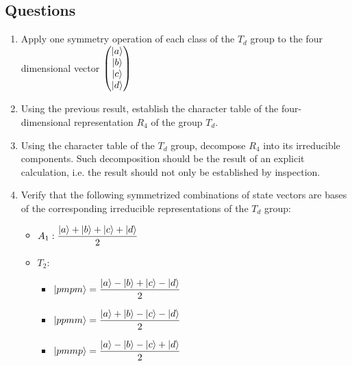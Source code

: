 \subsection{Questions}

\begin{enumerate}[label=(\roman*)]
\item Apply one symmetry operation of each class of the $T_d$ group to
  the four dimensional vector $\begin{pmatrix}
\left| a \right>\\ 
\left| b \right>\\
\left| c \right>\\
\left| d \right>\\
\end{pmatrix}$
\item Using the previous result, establish the character table of the
  four-dimensional representation $R_4$ of the group $T_d$.
\item Using the character
  table of the $T_d$ group, decompose $R_4$ into its irreducible
  components. Such decomposition should be the result of an explicit
  calculation, i.e. the result should not only be established by inspection.
\item Verify that the following symmetrized combinations of state
  vectors are bases of the corresponding irreducible representations
  of the $T_d$ group:
  \begin {itemize}
  \item $A_1: \dfrac{\left| a \right> + \left| b \right> + \left| c \right> + \left| d \right>}{2}$
  \item $T_2: $ \begin{itemize}
    \item $\left| pmpm \right> = \dfrac{\left| a \right> - \left| b \right> + \left| c \right> -
        \left| d \right>}{2}$
    \item $\left| ppmm \right> = \dfrac{\left| a \right> + \left| b \right> - \left| c \right> -
        \left| d \right>}{2}$
    \item $\left| pmmp \right> = \dfrac{\left| a \right> - \left| b \right> - \left| c \right> +
        \left| d \right>}{2}$
    \end{itemize}
  \end{itemize}
\end{enumerate}




